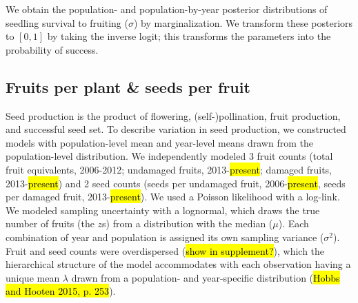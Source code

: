 \documentclass[12pt, oneside, titlepage]{article}   	%
\begin{document}
We obtain the population- and population-by-year posterior distributions of seedling survival to fruiting ($\sigma$) by marginalization. We transform these posteriors to $[0,1]$ by taking the inverse logit; this transforms the parameters into the probability of success.


\subsection{Fruits per plant \& seeds per fruit}

Seed production is the product of flowering, (self-)pollination, fruit production, and successful seed set. To describe variation in seed production, we constructed models with population-level mean and year-level means drawn from the population-level distribution. We independently modeled 3 fruit counts (total fruit equivalents, 2006-2012; undamaged fruits, 2013-\hl{present}; damaged fruits, 2013-\hl{present}) and 2 seed counts (seeds per undamaged fruit, 2006-\hl{present}, seeds per damaged fruit, 2013-\hl{present}). We used a Poisson likelihood with a log-link. We modeled sampling uncertainty with a lognormal, which draws the true number of fruits (the $z$s) from a distribution with the median ($\mu$). Each combination of year and population is assigned its own sampling variance ($\sigma^2$). Fruit and seed counts were overdispersed (\hl{show in supplement?}), which the hierarchical structure of the model accommodates with each observation having a unique mean $\lambda$ drawn from a population- and year-specific distribution (\hl{Hobbs and Hooten 2015, p. 253}). 


\end{document}
